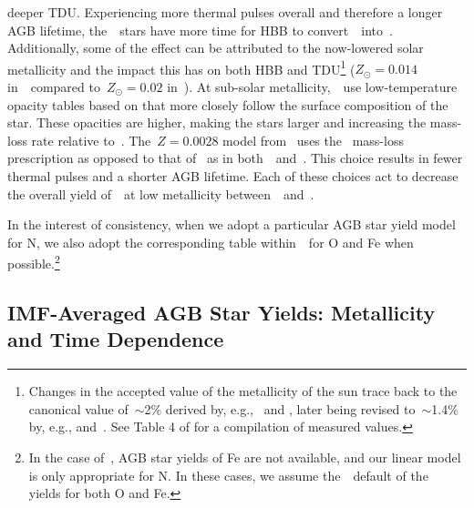 \documentclass[ms.tex]{subfiles}
\begin{document}
deeper TDU.
Experiencing more thermal pulses overall and therefore a longer AGB lifetime,
the~\karakas~stars have more time for HBB to convert~\Ctwelve~into~\Nfourteen.
Additionally, some of the effect can be attributed to the now-lowered solar
metallicity and the impact this has on both HBB and TDU\footnote{
	Changes in the accepted value of the metallicity of the sun trace back to
	the canonical value of~$\sim$2\% derived by, e.g.,~\citet{Anders1989} and
	\citet{Grevesse1998}, later being revised to~$\sim$1.4\% by, e.g.,
	\citet{Lodders2003} and~\citet*{Asplund2005}. See Table 4 of
	\citet{Asplund2009} for a compilation of measured values.
} ($Z_\odot = 0.014$ in~\karakas~compared to~$Z_\odot = 0.02$ in~\karakasten).
At sub-solar metallicity,~\karakas~use low-temperature opacity tables based on
\citet{Marigo2002} that more closely follow the surface composition of the
star.
These opacities are higher, making the stars larger and increasing the
mass-loss rate relative to~\karakasten.
The~$Z = 0.0028$ model from~\citet{Karakas2018} uses the~\citet{Bloecker1995}
mass-loss prescription as opposed to that of~\citet{Vassiliadis1993} as in
both~\citet{Karakas2010}~and~\citet{Karakas2016}.
This choice results in fewer thermal pulses and a shorter AGB lifetime.
Each of these choices act to decrease the overall yield of~\Nfourteen~at low
metallicity between~\karakasten~and~\karakas.
\par
In the interest of consistency, when we adopt a particular AGB star yield model
for N, we also adopt the corresponding table within~\vice~for O and Fe when
possible.\footnote{
	In the case of~\citet{Ventura2013, Ventura2014, Ventura2018, Ventura2020},
	AGB star yields of Fe are not available, and our linear model is only
	appropriate for N.
	In these cases, we assume the~\vice~default of the~\citet{Cristallo2011,
	Cristallo2015} yields for both O and Fe.
}

\subsection{IMF-Averaged AGB Star Yields: Metallicity and Time Dependence}
\label{sec:yields:imf_agb}
\end{document}
